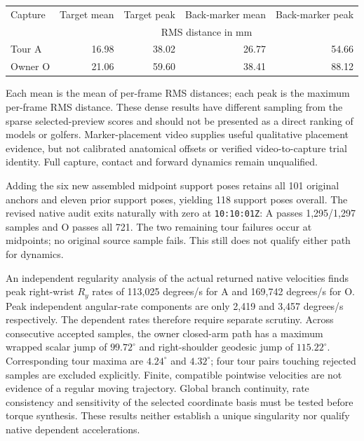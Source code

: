 \documentclass[11pt,a4paper]{article}
\begin{document}
\begin{center}
\begin{tabular}{lrrrr}
\hline
Capture & Target mean & Target peak & Back-marker mean & Back-marker peak\\
 & \multicolumn{4}{c}{RMS distance in mm}\\
\hline
Tour A & 16.98 & 38.02 & 26.77 & 54.66\\
Owner O & 21.06 & 59.60 & 38.41 & 88.12\\
\hline
\end{tabular}
\end{center}

Each mean is the mean of per-frame RMS distances; each peak is the maximum
per-frame RMS distance. These dense results have different sampling from
the sparse selected-preview scores and should not be presented as a direct
ranking of models or golfers. Marker-placement video supplies useful
qualitative placement evidence, but not calibrated anatomical offsets or
verified video-to-capture trial identity. Full capture, contact and forward
dynamics remain unqualified.

Adding the six new assembled midpoint support poses retains all 101 original
anchors and eleven prior support poses, yielding 118 support poses overall.
The revised native audit exits naturally with zero at \texttt{10:10:01Z}:
A passes 1,295/1,297 samples and O passes all 721. The two remaining tour
failures occur at midpoints; no original source sample fails. This still
does not qualify either path for dynamics.

An independent regularity analysis of the actual returned native velocities
finds peak right-wrist \(R_y\) rates of 113,025 degrees/s for A and 169,742
degrees/s for O. Peak independent angular-rate components are only
2,419 and 3,457 degrees/s respectively. The dependent rates therefore require
separate scrutiny. Across consecutive accepted samples, the owner closed-arm
path has a maximum wrapped scalar jump of \(99.72^{\circ}\) and right-shoulder
geodesic jump of \(115.22^{\circ}\). Corresponding tour maxima are
\(4.24^{\circ}\) and \(4.32^{\circ}\); four tour pairs touching rejected
samples are excluded explicitly. Finite, compatible pointwise velocities
are not evidence of a regular moving trajectory. Global branch continuity,
rate consistency and sensitivity of the selected coordinate basis must be
tested before torque synthesis. These results neither establish a unique
singularity nor qualify native dependent accelerations.
\end{document}

